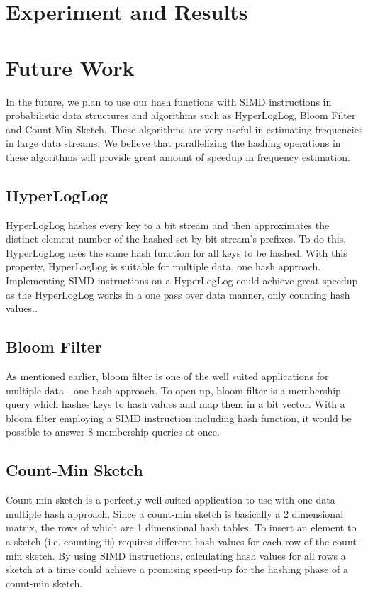\documentclass[11pt,oneside,a4paper]{article}
\makeatletter
\def\cleardoublepage{\clearpage\if@twoside \ifodd\c@page\else%
\hbox{}%
\thispagestyle{empty}%
\clearpage%
\if@twocolumn\hbox{}\clearpage\fi\fi\fi}
\makeatother
\begin{document}
\section{Experiment and Results}
\section{Future Work}
In the future, we plan to use our hash functions with SIMD instructions in probabilistic data structures and algorithms such as HyperLogLog, Bloom Filter and Count-Min Sketch. These algorithms are very useful in estimating frequencies in large data streams.  We believe that parallelizing the hashing operations in these algorithms  will provide great amount of speedup in frequency estimation. 
\subsection{HyperLogLog}
HyperLogLog hashes every key to a bit stream and then approximates the distinct element number of the hashed set by bit stream's prefixes. To do this, HyperLogLog uses the same hash function for all keys to be hashed. With this property, HyperLogLog is suitable for multiple data, one hash approach. 
Implementing SIMD instructions on a HyperLogLog could achieve great speedup as the HyperLogLog works in a one pass over data manner, only counting hash values..  
\subsection{Bloom Filter}
As mentioned earlier, bloom filter is one of the well suited applications for multiple data - one hash approach. To open up, bloom filter is a membership query which hashes keys to hash values and map them in a bit vector. With a bloom filter employing a SIMD instruction including hash function, it would be possible to answer 8 membership queries at once.
\subsection{Count-Min Sketch}
Count-min sketch is a perfectly well suited application to use with one data multiple hash approach. Since a count-min sketch is basically a 2 dimensional matrix, the rows of which are 1 dimensional hash tables. To insert an element to a sketch (i.e. counting it) requires different hash values for each row of the count-min sketch. By using  SIMD instructions, calculating hash values for all rows a sketch at a time could achieve a promising speed-up for the hashing phase of a count-min sketch.
\cleardoublepage
{}
\end{document}
